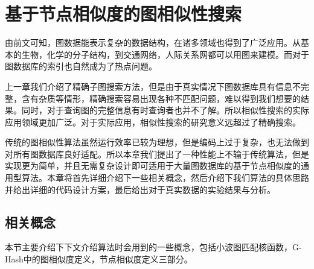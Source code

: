 \documentclass{XDBAthesis}
\begin{document}
\else
\fi
\chapter{基于节点相似度的图相似性搜索}
\label{chap:gHash}
由前文可知，图数据能表示复杂的数据结构，在诸多领域也得到了广泛应用。从基本的生物，化学的分子结构，到交通网络，人际关系网都可以用图来建模。而对于图数据库的索引也自然成为了热点问题。

上一章我们介绍了精确子图搜索方法，但是由于真实情况下图数据库具有信息不完整，含有杂质等情形，精确搜索容易出现各种不匹配问题，难以得到我们想要的结果。同时，对于查询图的完整信息有时查询者也并不了解。所以相似性搜索的实际应用领域更加广泛。对于实际应用，相似性搜索的研究意义远超过了精确搜索。

传统的图相似性算法虽然运行效率已较为理想，但是编码上过于复杂，也无法做到对所有图数据库良好适配。所以本章我们提出了一种性能上不输于传统算法，但是实现更为简单，并且无需复杂设计即可适用于大量图数据库的基于节点相似度的通用型算法。本章将首先详细介绍下一些相关概念，然后介绍下我们算法的具体思路并给出详细的代码设计方案，最后给出对于真实数据的实验结果与分析。
\section{相关概念}
本节主要介绍下下文介绍算法时会用到的一些概念，包括小波图匹配核函数，G-Hash中的图相似度定义，节点相似度定义三部分。
\end{document}

